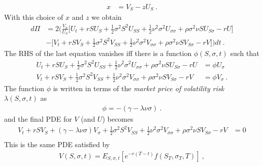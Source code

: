 \documentclass[10pt]{article}
\numberwithin{equation}{section}
\begin{document}
\begin{equation*}
	\begin{split}
		x &= V_S - z U_S \:.
	\end{split}
\end{equation*}
With this choice of $x$ and $z$ we obtain
\begin{equation*}
	\begin{split}
	d\Pi &= 2 \biggl(\frac{V_{\sigma}}{U_{\sigma}}\biggl[U_t + r S U_S + \frac{1}{2} \sigma^2 S^2 U_{SS}+ \frac{1}{2} \nu^2 \sigma^2 U_{\sigma\sigma}  + \rho \sigma^2 \nu S U_{S\sigma} - r U\biggr] \\
	& -\biggl[ V_t + r S V_S + \frac{1}{2} \sigma^2 S^2 V_{SS} + \frac{1}{2} \nu^2 \sigma^2 V_{\sigma\sigma} + \rho \sigma^2 \nu S V_{S\sigma} - r V \biggr] \biggr)dt\:.
	\end{split}
\end{equation*}
The RHS of the last equation vanishes iff there is a function $\phi(S,\sigma,t)$ such that
\begin{equation*}
	\begin{split}
	U_t + r S U_S + \frac{1}{2} \sigma^2 S^2 U_{SS}+ \frac{1}{2} \nu^2 \sigma^2 U_{\sigma\sigma}  + \rho \sigma^2 \nu S U_{S\sigma} - r U&=\phi U_{\sigma}\\
	V_t + r S V_S + \frac{1}{2} \sigma^2 S^2 V_{SS}+ \frac{1}{2} \nu^2 \sigma^2 V_{\sigma\sigma}  + \rho \sigma^2 \nu S V_{S\sigma} - r V &=\phi V_{\sigma}\:.
	\end{split}
\end{equation*}
The function $\phi$ is written in terms of the \emph{market price of volatility risk} $\lambda(S,\sigma,t)$ as
\begin{equation*}
	\begin{split}
	\phi =- (\gamma-\lambda \nu \sigma)\:.
	\end{split}
\end{equation*}
and the final PDE for $V$ (and $U$) becomes
\begin{equation}\label{PDE_vol_risk}
	\begin{split}
	V_t + r S V_S +(\gamma- \lambda \nu \sigma) V_{\sigma}+ \frac{1}{2} \sigma^2 S^2 V_{SS}+ \frac{1}{2} \nu^2 \sigma^2 V_{\sigma\sigma}  + \rho \sigma^2 \nu S V_{S\sigma} - r V&=0\\
	\end{split}
\end{equation}
This is the same PDE satisfied by
\begin{equation*}
	\begin{split}
	V(S,\sigma,t) = E_{S,\sigma,t} [e^{-r(T-t)} f(S_T,\sigma_T,T)] \:,
	\end{split}
\end{equation*}
\end{document}

